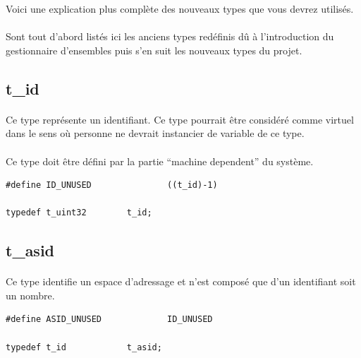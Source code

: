\documentclass[10pt,a4wide]{article}
\begin{document}
Voici une explication plus compl\`ete des nouveaux types que
vous devrez utilis\'es.

\paragraph{}

Sont tout d'abord list\'es ici les anciens types red\'efinis d\^u
\`a l'introduction du gestionnaire d'ensembles puis s'en suit les nouveaux
types du projet.

\subsection{t\_id}

\paragraph{}

Ce type repr\'esente un identifiant. Ce type pourrait \^etre consid\'er\'e
comme virtuel dans le sens o\`u personne ne devrait instancier de variable
de ce type.

\paragraph{}

Ce type doit \^etre d\'efini par la partie ``machine dependent'' du syst\`eme.

\begin{verbatim}
#define ID_UNUSED               ((t_id)-1)

typedef t_uint32        t_id;
\end{verbatim}

\subsection{t\_asid}

\paragraph{}

Ce type identifie un espace d'adressage et n'est compos\'e que
d'un identifiant soit un nombre.

\begin{verbatim}
#define ASID_UNUSED             ID_UNUSED

typedef t_id            t_asid;
\end{verbatim}
\end{document}
